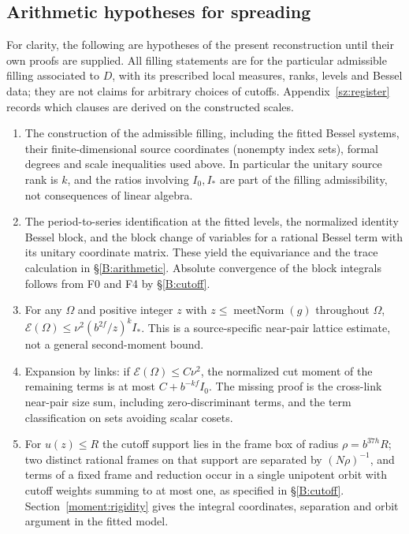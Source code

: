 \subsection{Arithmetic hypotheses for spreading}
\label{B:frontier}
For clarity, the following are hypotheses of the present
reconstruction until their own proofs are supplied. All filling
statements are for the particular admissible filling associated
to \(D\), with its prescribed local measures, ranks, levels and
Bessel data; they are not claims for arbitrary choices of cutoffs.
Appendix~\ref{sz:register} records which clauses are derived on the constructed scales.
\begin{enumerate}
\item[F0.] The construction of the admissible filling, including
the fitted Bessel systems, their finite-dimensional source
coordinates (nonempty index sets), formal degrees and scale
inequalities used above. In particular the unitary source rank is \(k\),
and the ratios involving \(I_0,I_*\) are part of the filling
admissibility, not consequences of linear algebra.
\item[F1.] The period-to-series identification at the fitted levels,
the normalized identity Bessel block, and the block change of
variables for a rational Bessel term with its unitary coordinate
matrix. These yield the equivariance and the trace calculation in
\S\ref{B:arithmetic}. Absolute convergence of the block integrals
follows from F0 and F4 by \S\ref{B:cutoff}.
\item[F2.] For any \(\Omega\) and positive integer \(z\) with
\(z\le\operatorname{meetNorm}(g)\) throughout \(\Omega\),
\(\mathcal E(\Omega)\le \nu^2(b^{2f}/z)^k I_*\).
This is a source-specific near-pair lattice estimate, not a
general second-moment bound.
\item[F3.] Expansion by links: if \(\mathcal E(\Omega)\le C\nu^2\),
the normalized cut moment of the remaining terms is
at most \(C+b^{-kf}I_0\). The missing proof is the cross-link
near-pair size sum, including zero-discriminant terms, and the
term classification on sets avoiding scalar cosets.
\item[F4.] For \(u(z)\le R\) the cutoff support lies in the
frame box of radius \(\rho=b^{37h}R\); two distinct rational frames
on that support are separated by \((N\rho)^{-1}\), and terms of a
fixed frame and reduction occur in a single unipotent orbit with
cutoff weights summing to at most one, as specified in
\S\ref{B:cutoff}. Section~\ref{moment:rigidity} gives the
integral coordinates, separation and orbit argument in the fitted model.

\end{enumerate}
